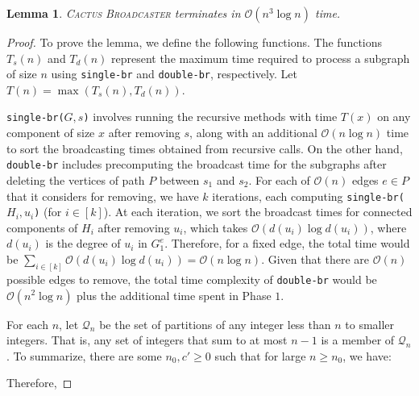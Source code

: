 \documentclass[letterpaper,11pt]{article}
\newtheorem{lemma}[theorem]{Lemma}
\newcommand{\oh}{\mathcal{O}}
\newcommand{\singlefunc}[1]{\texttt{single-br(#1)}\xspace}
\newcommand{\singlefuncc}{\texttt{single-br}\xspace}
\newcommand{\doublefuncc}{\texttt{double-br}\xspace}
\newcommand{\ouralgo}{\textsc{Cactus Broadcaster}\xspace}
\begin{document}
\begin{lemma} \label{lemma:2approxpoly}
\ouralgo terminates in $\oh(n^3 \log n)$ time.
\end{lemma}
\begin{proof}
To prove the lemma,
we define the following functions. The functions $T_s(n)$ and $T_d(n)$ represent the maximum time required to process a subgraph of size $n$ using \singlefuncc and \doublefuncc, respectively. Let $T(n)=\max (T_s(n), T_d(n))$.


\singlefunc{$G,s$} involves running the recursive methods with time $T(x)$ on any component of size $x$ after removing $s$,  
along with an additional $\oh(n\log n)$ time to sort the 
broadcasting times obtained from recursive calls. On the other hand, \doublefuncc includes precomputing the broadcast time for the subgraphs after deleting the vertices of path $P$ between $s_1$ and $s_2$. For each of $\oh(n)$ edges $e\in P$ that it considers for removing, we have $k$ iterations, each computing \singlefunc{$H_i,u_i$} (for $i\in [k]$). 
At each iteration, we sort the broadcast times for connected components of $H_i$ after removing $u_i$, which takes $\oh(d(u_i) \log d(u_i))$, where $d(u_i)$ is the degree of $u_i$ in $G^e_1$. Therefore, for a fixed edge, the total time would be $\sum_{i\in[k]} \oh(d(u_i) \log d(u_i)) = \oh(n \log n)$. Given that there are $\oh(n)$ possible edges to remove, the total time complexity of \doublefuncc would be $\oh(n^2 \log n)$ plus the additional time spent in Phase $1$.  

For each $n$, let $\mathcal{Q}_n$ be the
set of partitions of any integer less than $n$ to smaller integers. That is, any set of integers that sum to at most $n-1$ is a member of $\mathcal{Q}_n$.
To summarize, there are some $n_0,c' \geq 0$ such that for large $n \geq n_0$, we have:

Therefore,



\end{proof}
\end{document}
